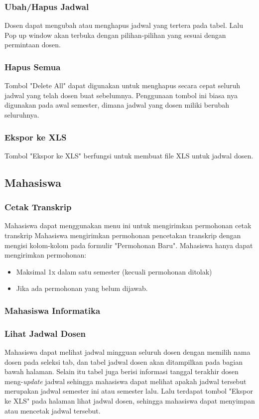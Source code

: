 \subsubsection{Ubah/Hapus Jadwal}
Dosen dapat mengubah atau menghapus jadwal yang tertera pada tabel. Lalu Pop up window akan terbuka dengan pilihan-pilihan yang sesuai dengan permintaan dosen.

\subsubsection{Hapus Semua}
Tombol "Delete All" dapat digunakan untuk menghapus secara cepat seluruh jadwal yang telah dosen buat sebelumnya. Penggunaan tombol ini biasa nya digunakan pada awal semester, dimana jadwal yang dosen miliki berubah seluruhnya.

\subsubsection{Ekspor ke XLS}
Tombol "Ekspor ke XLS" berfungsi untuk membuat file XLS untuk jadwal dosen.

\subsection{Mahasiswa}
\subsubsection{Cetak Transkrip}
Mahasiswa dapat menggunakan menu ini untuk mengirimkan permohonan cetak transkrip
Mahasiswa mengirimkan permohonan pencetakan transkrip dengan mengisi kolom-kolom pada formulir "Permohonan Baru".
Mahasiswa hanya dapat mengirimkan permohonan:
\begin{itemize}
\item Maksimal 1x dalam satu semester (kecuali permohonan ditolak)
\item Jika ada permohonan yang belum dijawab.
\end{itemize}

\subsubsection{Mahasiswa Informatika}
\subsubsection{Lihat Jadwal Dosen}
Mahasiswa dapat melihat jadwal mingguan seluruh dosen dengan memilih nama dosen pada seleksi tab, dan tabel jadwal dosen akan ditampilkan pada bagian bawah halaman. Selain itu tabel juga berisi informasi tanggal terakhir dosen meng-\textit{update} jadwal sehingga mahasiswa dapat melihat apakah jadwal tersebut merupakan jadwal semester ini atau semester lalu. 
Lalu terdapat tombol "Ekspor ke XLS" pada halaman lihat jadwal dosen, sehingga mahasiswa dapat menyimpan atau mencetak jadwal tersebut. 

